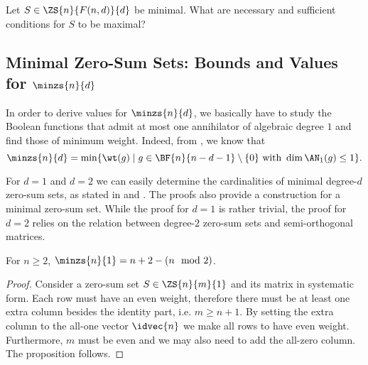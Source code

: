 \begin{question}
Let $S \in \ZS{n}{F(n,d)}{d}$ be minimal. What are necessary and sufficient conditions for $S$ to be maximal?
\end{question}


\subsection{Minimal Zero-Sum Sets: Bounds and Values for $\minzs{n}{d}$}
In order to derive values for $\minzs{n}{d}$, we basically have to study the Boolean functions that admit at most one annihilator of algebraic degree $1$ and find those of minimum weight. Indeed, from , we know that 
$$
\minzs{n}{d} = \min\{ \wt(g) \mid g \in \BF{n}{n-d-1} \setminus \{0\} ~\text{with}~ \dim \AN_1(g) \leq 1\}.
$$

For $d=1$ and $d=2$ we can easily determine the cardinalities of minimal degree-$d$ zero-sum sets, as stated in  and . The proofs also provide a construction for a minimal zero-sum set. While the proof for $d=1$ is rather trivial, the proof for $d=2$ relies on the relation between degree-$2$ zero-sum sets and semi-orthogonal matrices.
\begin{proposition}
For $n \geq 2$, $\minzs{n}{1} = n + 2 - (n \mod 2)$.
\end{proposition}
\begin{proof}
Consider a zero-sum set $S\in\ZS{n}{m}{1}$ and its matrix in systematic form. Each row must have an even weight, therefore there must be at least one extra column besides the identity part, i.e. $m \ge n+1$. By setting the extra column to the all-one vector $\idvec{n}$ we make all rows to have even weight. Furthermore, $m$ must be even and we may also need to add the all-zero column. The proposition follows.
\end{proof}

